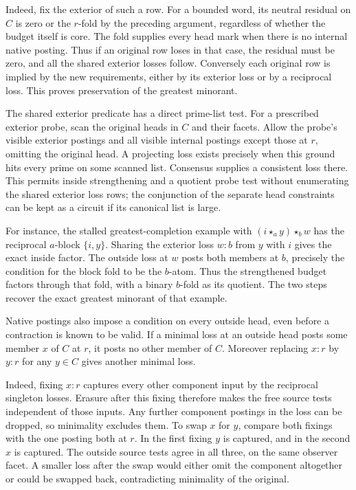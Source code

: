 Indeed, fix the exterior of such a row. For a bounded
word, its neutral residual on $C$ is zero or the
$r$-fold by the preceding argument, regardless of
whether the budget itself is core. The fold supplies
every head mark when there is no internal native
posting. Thus if an original row loses in that
case, the residual must be zero, and all the shared
exterior losses follow. Conversely each original
row is implied by the new requirements, either
by its exterior loss or by a reciprocal loss.
This proves preservation of the greatest minorant.

The shared exterior predicate has a direct
prime-list test. For a prescribed exterior probe,
scan the original heads in $C$ and their facets.
Allow the probe's visible exterior postings and
all visible internal postings except those at $r$,
omitting the original head. A projecting loss
exists precisely when this ground hits every prime
on some scanned list. Consensus supplies a consistent
loss there. This permits inside strengthening and
a quotient probe test without enumerating the
shared exterior loss rows; the conjunction of
the separate head constraints can be kept as a
circuit if its canonical list is large.

For instance, the stalled greatest-completion
example with $(i\star_a y)\star_b w$ has the
reciprocal $a$-block $\{i,y\}$. Sharing the
exterior loss $w:b$ from $y$ with $i$ gives the
exact inside factor. The outside loss at $w$
posts both members at $b$, precisely the
condition for the block fold to be the $b$-atom.
Thus the strengthened budget factors through
that fold, with a binary $b$-fold as its
quotient. The two steps recover the exact
greatest minorant of that example.

Native postings also impose a condition on every
outside head, even before a contraction is known
to be valid. If a minimal loss at an outside head
posts some member $x$ of $C$ at $r$, it posts no
other member of $C$. Moreover replacing $x{:}r$ by
$y{:}r$ for any $y\in C$ gives another minimal loss.

Indeed, fixing $x{:}r$ captures every other component
input by the reciprocal singleton losses. Erasure
after this fixing therefore makes the free source
tests independent of those inputs. Any further
component postings in the loss can be dropped, so
minimality excludes them. To swap $x$ for $y$,
compare both fixings with the one posting both at
$r$. In the first fixing $y$ is captured, and in
the second $x$ is captured. The outside source tests
agree in all three, on the same observer facet.
A smaller loss after the swap would either omit
the component altogether or could be swapped back,
contradicting minimality of the original.

